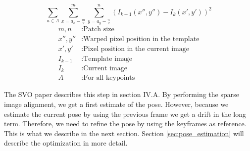 \documentclass[11pt,a4paper,titlepage,oneside]{report}
\begin{document}
\begin{equation}\label{eq:intensity}
  \sum_{a \in A}\sum_{x=a_x-\frac{m}{2}}^m\sum_{y=a_y-\frac{n}{2}}^n(I_{k-1}(x'',y'')-I_{k}(x',y'))^2
\end{equation}
\begin{align*}
  m,n         &: \text{Patch size}\\
  x'',y''    &: \text{Warped pixel position in the template}\\
  x',y'      &: \text{Pixel position in the current image}\\
  I_{k-1}    &: \text{Template image}\\
  I_{k}      &: \text{Current image}\\
  A          &: \text{For all keypoints}
\end{align*}

The SVO paper \cite{svo} describes this step in section IV.A. By performing the sparse image alignment, we get a first estimate of the pose. However, because we estimate the current pose by using the previous frame we get a drift in the long term. Therefore, we need to refine the pose by using the keyframes as reference. This is what we describe in the next section. Section \ref{sec:pose_estimation} will describe the optimization in more detail.
\end{document}
